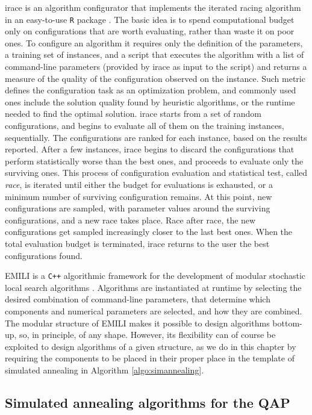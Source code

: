 irace is an algorithm configurator that implements the iterated racing algorithm 
in an easy-to-use \texttt{R} package
\cite{LopDubPerStuBir2016irace,BirStuPaqVar02:gecco,MarMoo1997air}. 
The basic idea is to spend computational budget only on configurations
that are worth evaluating, rather than waste it on poor ones.
To configure an algorithm it requires only the definition of the parameters,
a training set of instances, and a script that executes the algorithm with 
a list of command-line parameters (provided by irace as input to the script) 
and returns a measure of the quality of the configuration observed on the instance. 
Such metric defines the configuration task as an optimization problem, and commonly 
used ones include the solution quality found by heuristic algorithms, 
or the runtime needed to find the optimal solution.
irace starts from a set of random configurations, and begins to evaluate all of them 
on the training instances, sequentially. The configurations are ranked for each instance, 
based on the results reported. After a few instances, irace begins to discard the configurations 
that perform statistically worse than the best ones, and proceeds to evaluate only the surviving ones. 
This process of configuration evaluation and statistical test, called \textit{race}, 
is iterated until either the budget for evaluations is exhausted, or a minimum number 
of surviving configuration remains. At this point, new configurations are sampled, 
with parameter values around the surviving configurations, and a new race takes place. 
Race after race, the new configurations get sampled increasingly closer to the last best ones.
When the total evaluation budget is terminated, irace returns to the user the best configurations found.

EMILI is a \texttt{C++} algorithmic framework for the development of modular 
stochastic local search algorithms \cite{PagStu2019:ejor}.
Algorithms are instantiated at runtime by selecting the desired combination of 
command-line parameters, that determine which components and numerical parameters 
are selected, and how they are combined.
The modular structure of EMILI makes it possible to design algorithms
bottom-up, so, in principle, of any shape.
However, its flexibility can of course be exploited to design algorithms 
of a given structure, as we do in this chapter by requiring the components 
to be placed in their proper place in the template of simulated annealing
in Algorithm \ref{algo:simannealing}.

\subsection{Simulated annealing algorithms for the QAP}
\label{sec:expsqap}

